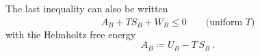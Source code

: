 \documentclass[\ifafour a4paper,12pt,\else a5paper,10pt,\fi%
onecolumn,oneside,article,%
british%
]{memoir}
\makeatletter
\theoremstyle{remark}
\theoremstyle{innote}
\def\sum{\DOTSI\sumop\slimits@}
\newcommand*{\de}{\partialup}%
\newcommand*{\defd}{\coloneqq}
\renewcommand*{\le}{\leqslant}%
\newcommand*{\p}{\mathrm{P}}%
\renewcommand*{\|}[1][]{\nonscript\,#1\vert\nonscript\;\mathopen{}}
\newcommand*{\tsum}{\mathop{\textstyle\sum}\nolimits}
\newcommand*{\yq}{\bm{q}}
\makeatother
\begin{document}
The last inequality can also be written
\begin{equation}
  \label{eq:2nd_law_body_unifT_helmholtz}
  \Dot{A}_{B} + \Dot{T}S_{B} + W_{B} \le 0 \qquad\text{(uniform $T$)}
\end{equation}
with the Helmholtz free energy
\begin{equation}
  \label{eq:helmholtz_A}
 A_{B} \defd U_{B} - T\,S_{B} \ .
\end{equation}






\end{document}

